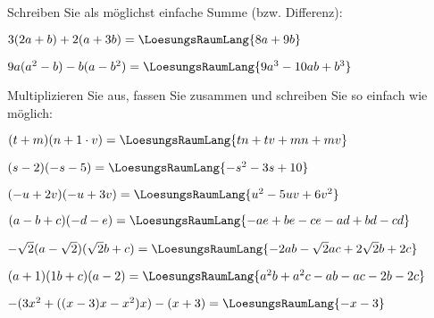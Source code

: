 
Schreiben Sie als möglichst einfache Summe (bzw. Differenz):
\begin{bbwAufgabenBlock}
\item $3(2a+b) + 2(a+3b)=\LoesungsRaumLang{8a+9b}$
\item $9a(a^2-b)-b(a-b^2) = \LoesungsRaumLang{9a^3 - 10ab + b^3}$
\end{bbwAufgabenBlock}
\newpage


Multiplizieren Sie aus, fassen Sie zusammen und schreiben Sie so
einfach wie möglich:
\begin{bbwAufgabenBlock}
\item $(t+m)(n+1\cdot{}v)=\LoesungsRaumLang{tn+tv+mn+mv}$
\item $(s-2)(-s-5) =\LoesungsRaumLang{-s^2-3s+10}$
\item $(-u+2v)(-u+3v) = \LoesungsRaumLang{u^2-5uv +6v^2}$
\item $(a-b+c)(-d-e)=\LoesungsRaumLang{-ae+be-ce-ad+bd-cd}$\newpage
\item $-\sqrt{2}(a-\sqrt{2})(\sqrt{2}b + c) =\LoesungsRaumLang{-2ab- \sqrt{2}ac + 2\sqrt{2}b +2c}$
\item $(a+1)(1b+c)(a-2) = \LoesungsRaumLang{a^2b+a^2c-ab-ac-2b-2c}$
\item $-(3x^2+((x-3)x-x^2)x)-(x+3) = \LoesungsRaumLang{-x-3}$
\end{bbwAufgabenBlock} 

\newpage




